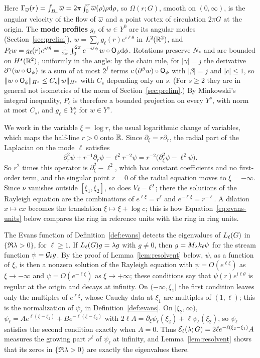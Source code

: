 Here $\Gamma_{\overline{\omega}}(r)=\int_{B_r}\overline{\omega}=2\pi\int_0^r\overline{\omega}(\rho)\rho\dd\rho$,
so $\Omega(r;G)$, smooth on $(0,\infty)$, is the angular velocity of the flow of
$\overline{\omega}$ and a point vortex of circulation $2\pi G$ at the origin. The
\textbf{mode profiles} $g_\ell$ of $w\in Y^0$ are its angular modes
(Section~\ref{sec:prelim}), $w=\sum_\ell g_\ell(r)e^{i\ell\theta}$ in $L^2(\mathbb{R}^2)$, and
$P_\ell w=g_\ell(r)e^{i\ell\theta}=\frac1{2\pi}\int_0^{2\pi}e^{-i\ell\phi}\,w\circ\mathsf{O}_\phi\dd\phi$.
Rotations preserve $N_*$ and are bounded on $H^s(\mathbb{R}^2)$, uniformly in the angle:
by the chain rule, for $|\gamma|=j$ the derivative $\partial^\gamma(w\circ\mathsf{O}_\phi)$ is a
sum of at most $2^j$ terms $c\,(\partial^\beta w)\circ\mathsf{O}_\phi$ with $|\beta|=j$ and
$|c|\le1$, so $\|w\circ\mathsf{O}_\phi\|_{H^s}\le C_s\|w\|_{H^s}$ with $C_s$ depending only
on $s$. (For $s\ge2$ they are in general not isometries of the norm of
Section~\ref{sec:prelim}.) By Minkowski's integral inequality, $P_\ell$ is therefore
a bounded projection on every $Y^s$, with norm at most $C_s$, and
$g_\ell\in Y^s_\ell$ for $w\in Y^s$.

We work in the variable $\xi=\log r$, the usual logarithmic change of variables,
which maps the half-line $r>0$ onto $\mathbb{R}$. Since $\partial_\xi=r\partial_r$, the
radial part of the Laplacian on the mode $\ell$ satisfies
\[
\partial_r^2\psi+r^{-1}\partial_r\psi-\ell^2r^{-2}\psi=r^{-2}\big(\partial_\xi^2\psi-\ell^2\psi\big).
\]
So $r^2$ times this operator is $\partial_\xi^2-\ell^2$, which has constant
coefficients and no first-order term, and the singular point $r=0$ of the radial
equation moves to $\xi=-\infty$. Since $\nu$ vanishes outside
$[\xi_1,\xi_2]$, so does $V_\ell-\ell^2$; there the solutions of the Rayleigh
equation are the combinations of $e^{\ell\xi}=r^\ell$ and $e^{-\ell\xi}=r^{-\ell}$.
A dilation $x\mapsto cx$ becomes the translation $\xi\mapsto\xi+\log c$; this is
how Equation~\eqref{eq:evans-units} below compares the ring in reference units
with the ring in ring units.

The Evans function of Definition~\ref{def:evans} detects the eigenvalues of
$L_{\ell}(G)$ in $\{\Re\lambda>0\}$, for $\ell\ge1$. If
$L_{\ell}(G)g=\lambda g$ with $g\ne0$, then $g=M_\lambda k_\ell\psi$
for the stream function $\psi=\mathcal{G}_\ell g$. By the proof of
Lemma~\ref{lem:resolvent} below, $\psi$, as a function of $\xi$, is then a nonzero
solution of the Rayleigh equation with $\psi=O(e^{\ell\xi})$ as $\xi\to-\infty$
and $\psi=O(e^{-\ell\xi})$ as $\xi\to+\infty$; these conditions say that
$\psi(r)e^{i\ell\theta}$ is regular at the origin and decays at infinity. On
$(-\infty,\xi_1]$ the first condition leaves only the multiples of $e^{\ell\xi}$,
whose Cauchy data at $\xi_1$ are multiples of $(1,\ell)$; this is the
normalization of $\psi_\ell$ in Definition~\ref{def:evans}. On $[\xi_2,\infty)$,
$\psi_\ell=Ae^{\ell(\xi-\xi_2)}+Be^{-\ell(\xi-\xi_2)}$ with
$2\ell A=\partial_\xi\psi_\ell(\xi_2)+\ell\psi_\ell(\xi_2)$, so $\psi_\ell$ satisfies the
second condition exactly when $A=0$. Thus
$\mathcal{E}_\ell(\lambda;G)=2\ell e^{-\ell(\xi_2-\xi_1)}A$ measures the growing part
$r^\ell$ of $\psi_\ell$ at infinity, and Lemma~\ref{lem:resolvent} shows that its
zeros in $\{\Re\lambda>0\}$ are exactly the eigenvalues there.

